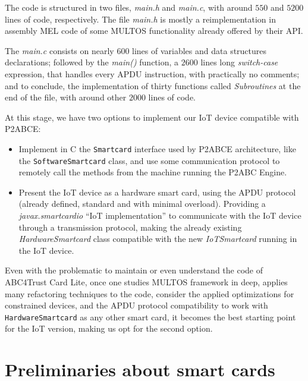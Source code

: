 The code is structured in two files, \textit{main.h} and \textit{main.c}, with around $550$ and $5200$ lines of code, respectively. The file \textit{main.h} is mostly a reimplementation in assembly MEL code of some MULTOS functionality already offered by their API.

The \textit{main.c} consists on nearly $600$ lines of variables and data structures declarations; followed by the \textit{main()} function, a $2600$ lines long \textit{switch-case} expression, that handles every APDU instruction, with practically no comments; and to conclude, the implementation of thirty functions called \textit{Subroutines} at the end of the file, with around other $2000$ lines of code.

\hfil

At this stage, we have two options to implement our IoT device compatible with P2ABCE:

\begin{itemize}
	\item Implement in C the \texttt{Smartcard} interface used by P2ABCE architecture, like the \texttt{SoftwareSmartcard} class, and use some communication protocol to remotely call the methods from the machine running the P2ABC Engine.
	\item Present the IoT device as a hardware smart card, using the APDU protocol (already defined, standard and with minimal overload). Providing a \textit{javax.smartcardio} ``IoT implementation'' to communicate with the IoT device through a transmission protocol, making the already existing \textit{HardwareSmartcard} class compatible with the new \textit{IoTSmartcard} running in the IoT device.
\end{itemize}

Even with the problematic to maintain or even understand the code of ABC4Trust Card Lite, once one studies MULTOS framework in deep, applies many refactoring techniques to the code, consider the applied optimizations for constrained devices, and the APDU protocol compatibility to work with \texttt{HardwareSmartcard} as any other smart card, it becomes the best starting point for the IoT version, making us opt for the second option.





\section{Preliminaries about smart cards}

